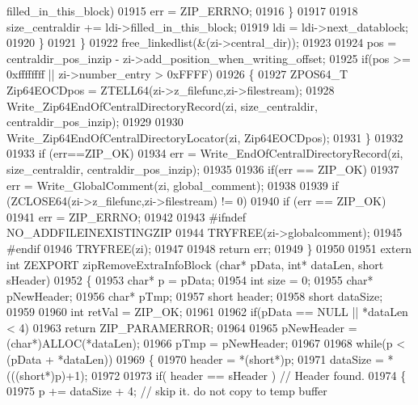 \begin{DoxyCode}
      filled\_in\_this\_block)
01915                     err = ZIP\_ERRNO;
01916             \}
01917 
01918             size\_centraldir += ldi->filled\_in\_this\_block;
01919             ldi = ldi->next\_datablock;
01920         \}
01921     \}
01922     free\_linkedlist(&(zi->central\_dir));
01923 
01924     pos = centraldir\_pos\_inzip - zi->add\_position\_when\_writing\_offset;
01925     \textcolor{keywordflow}{if}(pos >= 0xffffffff || zi->number\_entry > 0xFFFF)
01926     \{
01927       ZPOS64\_T Zip64EOCDpos = ZTELL64(zi->z\_filefunc,zi->filestream);
01928       Write\_Zip64EndOfCentralDirectoryRecord(zi, size\_centraldir, centraldir\_pos\_inzip);
01929 
01930       Write\_Zip64EndOfCentralDirectoryLocator(zi, Zip64EOCDpos);
01931     \}
01932 
01933     \textcolor{keywordflow}{if} (err==ZIP\_OK)
01934       err = Write\_EndOfCentralDirectoryRecord(zi, size\_centraldir, centraldir\_pos\_inzip);
01935 
01936     \textcolor{keywordflow}{if}(err == ZIP\_OK)
01937       err = Write\_GlobalComment(zi, global\_comment);
01938 
01939     \textcolor{keywordflow}{if} (ZCLOSE64(zi->z\_filefunc,zi->filestream) != 0)
01940         \textcolor{keywordflow}{if} (err == ZIP\_OK)
01941             err = ZIP\_ERRNO;
01942 
01943 \textcolor{preprocessor}{#ifndef NO\_ADDFILEINEXISTINGZIP}
01944     TRYFREE(zi->globalcomment);
01945 \textcolor{preprocessor}{#endif}
01946     TRYFREE(zi);
01947 
01948     \textcolor{keywordflow}{return} err;
01949 \}
01950 
01951 \textcolor{keyword}{extern} \textcolor{keywordtype}{int} ZEXPORT zipRemoveExtraInfoBlock (\textcolor{keywordtype}{char}* pData, \textcolor{keywordtype}{int}* dataLen, \textcolor{keywordtype}{short} sHeader)
01952 \{
01953   \textcolor{keywordtype}{char}* p = pData;
01954   \textcolor{keywordtype}{int} size = 0;
01955   \textcolor{keywordtype}{char}* pNewHeader;
01956   \textcolor{keywordtype}{char}* pTmp;
01957   \textcolor{keywordtype}{short} header;
01958   \textcolor{keywordtype}{short} dataSize;
01959 
01960   \textcolor{keywordtype}{int} retVal = ZIP\_OK;
01961 
01962   \textcolor{keywordflow}{if}(pData == NULL || *dataLen < 4)
01963     \textcolor{keywordflow}{return} ZIP\_PARAMERROR;
01964 
01965   pNewHeader = (\textcolor{keywordtype}{char}*)ALLOC(*dataLen);
01966   pTmp = pNewHeader;
01967 
01968   \textcolor{keywordflow}{while}(p < (pData + *dataLen))
01969   \{
01970     header = *(\textcolor{keywordtype}{short}*)p;
01971     dataSize = *(((\textcolor{keywordtype}{short}*)p)+1);
01972 
01973     \textcolor{keywordflow}{if}( header == sHeader ) \textcolor{comment}{// Header found.}
01974     \{
01975       p += dataSize + 4; \textcolor{comment}{// skip it. do not copy to temp buffer}

\end{DoxyCode}
